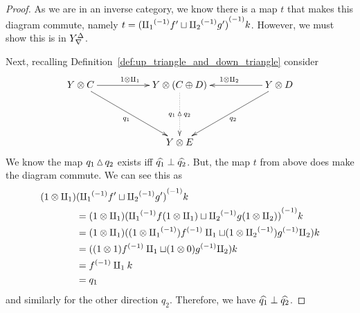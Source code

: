 \begin{proof}
  As we are in an inverse category, we know there is a map $t$ that makes this diagram commute,
  namely $t =  {({\amalg_{1}}^{(-1)} f' \sqcup {\amalg_{2}}^{(-1)} g')}^{(-1)}k$. However, we must show this is in ${Y}^{\Delta}_{\nabla}$.

  Next, recalling Definition~\ref{def:up_triangle_and_down_triangle} consider
  \begin{equation*}
    \xymatrix@C+0pt @R+20pt{
      Y\*C\ar[rr]^{1\*\cpa} \ar[drr]_{q_1} &&Y\*(C\+D)   \ar@{.>}[d]|-{q_1\tjup q_2}
        && Y\*D \ar[ll]_{1\*\cpb} \ar[dll]^{q_2}\\
      &&Y\*E
      }%
  \end{equation*}
  We know the map $q_1\operatorname{\vartriangle} q_2$ exists iff $\widehat{q_1} \perp \widehat{q_2}$. But, the map $t$ from above
  does make the diagram commute. We can see this as
  \begin{align*}
    (1\*\cpa)& \inv{(\icpa f' \djoin \icpb g')}k\\
    &=  (1\*\cpa)\inv{(\icpa f(1\*\cpa) \djoin \icpb g(1\*\cpb))}k\\
    &=  (1\*\cpa)((1\*\icpa) \inv{f}\cpa \djoin (1\*\icpb) \inv{g}\cpb) k \\
    &=  ((1\*1) \inv{f}\cpa \djoin (1\*0) \inv{g}\cpb) k \\ %
    &=  \inv{f} \cpa k\\
    &= q_1
  \end{align*}
  and similarly for the other direction $q_2$. Therefore, we have
  $\widehat{q_1} \perp \widehat{q_2}$.


\end{proof}
